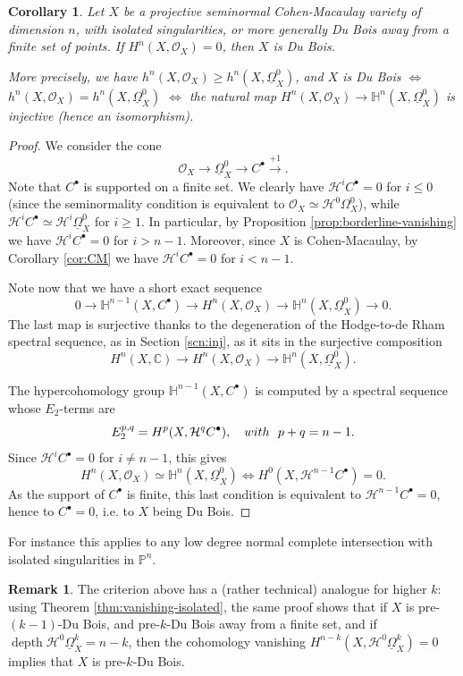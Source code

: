\documentclass[11pt]{amsart}
\newtheorem{corollary}[equation]{Corollary}
\theoremstyle{definition}
\newtheorem{remark}[equation]{Remark}
\theoremstyle{plain}
\renewcommand{\H}{\mathcal H}
\renewcommand{\O}{\mathcal O}
\newcommand{\CC}{\mathbb C}
\newcommand{\HH}{\mathbb H}
\newcommand{\PP}{\mathbb P}
\newcommand{\DB}{\underline{\Omega}} %
\DeclareMathOperator{\depth}{depth}
\begin{document}
\begin{corollary}\label{cor:DB-CM-criterion}
Let $X$ be a projective seminormal Cohen-Macaulay variety of dimension $n$, with isolated singularities, or more generally 
Du Bois away from a finite set of points.
If $H^n (X, \O_X) = 0$, then $X$ is Du Bois.

More precisely, we have $h^n (X, \O_X) \ge h^n (X, \DB^0_X)$, and $X$ is Du Bois $\iff$ $h^n (X, \O_X) = h^n (X, \DB^0_X)$
$\iff$ the natural map $H^n (X, \O_X) \to \HH^n (X, \DB_X^0)$  is injective (hence an isomorphism).
\end{corollary}
\begin{proof}
We consider the cone 
$$\O_X \to \DB_X^0 \to C^\bullet \overset{+1}{\longrightarrow}.$$
Note that $C^\bullet$ is supported on a finite set.
We clearly  have $\H^i C^\bullet = 0$ for $i \le 0$ (since the seminormality condition is equivalent to $\O_X \simeq \H^0 \Omega_X^0$), while $\H^i C^\bullet \simeq \H^i \DB_X^0$ for $i \ge 1$. 
In particular, by Proposition \ref{prop:borderline-vanishing} we have $\H^i C^\bullet = 0$ for $i > n -1$. Moreover, since $X$ is Cohen-Macaulay, by 
Corollary \ref{cor:CM} we have $\H^i C^\bullet = 0$ for $i< n-1$.

Note now that we have a short exact sequence 
$$0 \to \HH^{n-1} (X, C^\bullet) \to H^n (X, \O_X) \to \HH^n (X, \DB_X^0) \to 0.$$
The last map is surjective thanks to the degeneration of the Hodge-to-de Rham spectral sequence, as in Section \ref{scn:inj}, as it sits in the surjective composition
$$H^n (X, \CC) \to H^n (X, \O_X) \to  \HH^n (X, \DB_X^0).$$

The hypercohomology group $\HH^{n-1} (X, C^\bullet)$ is computed by a spectral sequence whose $E_2$-terms are 
$$E^{p, q}_2 = H^p (X, \H^q C^\bullet), \,\,\,\,\,\,{\rm with}\,\,\,\,p +q = n-1.$$
Since $\H^i C^\bullet = 0$ for $i \neq n-1$, this gives
$$H^n (X, \O_X) \simeq \HH^n (X, \DB_X^0) \iff H^0 (X, \H^{n-1} C^\bullet) = 0.$$
As the support of $C^\bullet$ is finite, this last condition is equivalent to $\H^{n-1} C^\bullet = 0$, hence to $C^\bullet = 0$, i.e. to $X$ being Du Bois. \end{proof}

For instance this applies to any low degree normal complete intersection with isolated singularities in $\PP^n$.

\begin{remark}
The criterion above has a (rather technical) analogue for higher $k$: using Theorem \ref{thm:vanishing-isolated}, the same proof shows that if $X$ is pre-$(k-1)$-Du Bois, and 
pre-$k$-Du Bois away from a finite set, and if $\depth \H^0 \DB_X^k = n-k$, then the cohomology vanishing $H^{n-k} (X,  \H^0 \DB_X^k) = 0$ 
implies that $X$ is pre-$k$-Du Bois.
\end{remark} 
\end{document}
